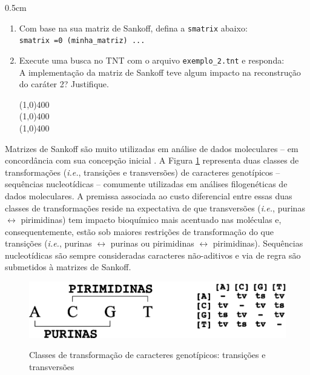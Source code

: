 \begin{refsection}
\begin {myindentpar}{0.5cm}
\begin{enumerate}[\itshape i.]
	\item{Com base na sua matriz de Sankoff, defina a \texttt{smatrix} abaixo:}\\
\texttt{smatrix =0 (minha\_matriz) ... }

\vspace{90pt}

	\item{Execute uma busca no TNT com o arquivo \texttt{exemplo\_2.tnt} e responda:}\\
	A implementação da matriz de Sankoff teve algum impacto na reconstrução do caráter 2? Justifique.
	
	\line(1,0){400}\\
	\line(1,0){400}\\
	\line(1,0){400}\\

\end{enumerate}
\end{myindentpar}

Matrizes de Sankoff são muito utilizadas em análise de dados moleculares -- em concordância com sua concepção inicial \parencite{Sankoff_1975}. A Figura \ref{tut6:fig:tv_ts} representa duas classes de transformações (\textit{i.e.}, transições e transversões) de caracteres genotípicos -- sequências nucleotídicas -- comumente utilizadas em análises filogenéticas de dados moleculares. A premissa associada ao custo diferencial entre essas duas classes de transformações reside na expectativa de que transversões (\textit{i.e.}, purinas $\longleftrightarrow$ pirimidinas) tem impacto bioquímico mais acentuado nas moléculas e, consequentemente, estão sob maiores restrições de transformação do que transições (\textit{i.e.}, purinas $\longleftrightarrow$ purinas ou pirimidinas $\longleftrightarrow$ pirimidinas). Sequências nucleotídicas são sempre consideradas caracteres não-aditivos e via de regra são submetidos à matrizes de Sankoff.

  \begin{figure}[H]
       \centering
      {\includegraphics[scale=1.00]{figures/tut6/tv_ts.eps}}
	{\caption[Classes de transformação de caracteres genotípicos]{Classes de transformação de caracteres genotípicos: transições e transversões}\label{tut6:fig:tv_ts}}
  \end{figure}


\end{refsection}
